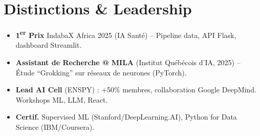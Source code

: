 \documentclass[a4paper,11pt]{article}
\begin{document}
\section{Distinctions \& Leadership}
\begin{itemize}[leftmargin=*, label=\tiny$\bullet$, nosep]
    \item \small{\textbf{1\textsuperscript{er} Prix} IndabaX Africa 2025 (IA Santé) -- Pipeline data, API Flask, dashboard Streamlit.}
    \item \small{\textbf{Assistant de Recherche @ MILA} (Institut Québécois d'IA, 2025) -- Étude ``Grokking'' sur réseaux de neurones (PyTorch).}
    \item \small{\textbf{Lead AI Cell} (ENSPY) : +50\% membres, collaboration Google DeepMind. Workshops ML, LLM, React.}
    \item \small{\textbf{Certif.} Supervised ML (Stanford/DeepLearning.AI), Python for Data Science (IBM/Coursera).}
\end{itemize}
\end{document}
